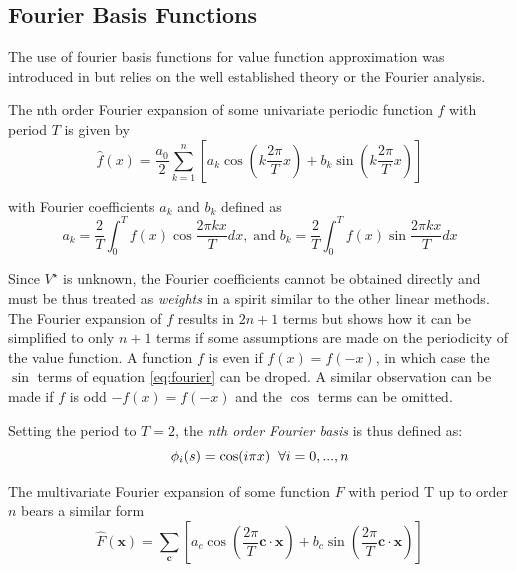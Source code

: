 \documentclass[12pt, oneside, extrafontsizes]{memoir}  %
\def\optimal{\star}
\theoremstyle{plain}
\theoremstyle{definition}
\begin{document}
\subsection{Fourier Basis Functions}

The use of fourier basis functions for value function approximation was introduced in
\cite{Konidaris2011b} but relies on the well established theory or the Fourier analysis.

The nth order Fourier expansion of some univariate periodic function $f$ with period
$T$ is given by
\begin{equation}
\hat{f}(x) = \frac{a_0}{2} \sum_{k=1}^n \left[ a_k \cos\left(k\frac{2\pi}{T} x\right) +
b_k \sin \left(k \frac{2\pi}{T}x \right) \right]
\label{eq:fourier}
\end{equation}

with Fourier coefficients $a_k$ and $b_k$ defined as
\begin{equation}
a_k = \frac{2}{T} \int_0^T f(x) \cos \frac{2\pi kx}{T}dx, \; \mbox{and} \; b_k = \frac{2}
{T} \int_0^T f(x) \sin \frac{2\pi kx}{T}dx
\end{equation}

Since $V^\optimal$ is unknown, the Fourier coefficients cannot be obtained directly
and must be thus treated as \textit{weights} in a spirit similar to the other linear
methods. The Fourier expansion of $f$ results in $2n+1$ terms but
\cite{Konidaris2011b} shows how it can be simplified to only $n+1$ terms if some
assumptions are made on the periodicity of the value function. A function $f$ is even if
$f(x) = f(-x)$, in which case the $\sin$ terms of equation \ref{eq:fourier} can be
droped. A similar observation can be made if $f$ is odd $-f(x) = f(-x)$ and the
$\cos$ terms can be omitted. 


Setting the period to $T=2$, the \textit{nth order Fourier basis} is thus defined as:
\begin{equation}
\phi_i(s) = \cos(i\pi x) \hspace{2mm} \forall i = 0, ..., n
\end{equation}

The multivariate Fourier expansion of some function $F$ with period T up to order $n$
bears a similar form
\begin{equation}
\hat{F}(\mathbf{x}) = \sum_{\mathbf{c}} \left[ a_c \cos \left( \frac{2\pi}{T} \mathbf{c}
\cdot \mathbf{x} \right) +  b_c \sin \left( \frac{2\pi}{T} \mathbf{c} \cdot \mathbf{x}
\right)\right]
\label{eq:multi-fourier}
\end{equation}
\end{document}
